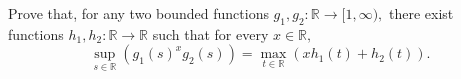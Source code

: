 Prove that, for any two bounded functions $g_1,g_2 : \mathbb{R}\to[1,\infty),$ there exist functions $h_1,h_2 : \mathbb{R}\to\mathbb{R}$ such that for every $x\in\mathbb{R},$\[\sup_{s\in\mathbb{R}}\left(g_1(s)^xg_2(s)\right)=\max_{t\in\mathbb{R}}\left(xh_1(t)+h_2(t)\right).\]